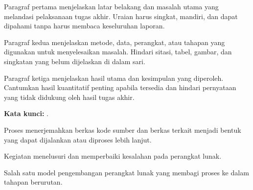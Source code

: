 Paragraf pertama menjelaskan latar belakang dan masalah utama yang melandasi pelaksanaan tugas akhir. Uraian harus singkat, mandiri, dan dapat dipahami tanpa harus membaca keseluruhan laporan.

Paragraf kedua menjelaskan metode, data, perangkat, atau tahapan yang digunakan untuk menyelesaikan masalah. Hindari sitasi, tabel, gambar, dan singkatan yang belum dijelaskan di dalam sari.

Paragraf ketiga menjelaskan hasil utama dan kesimpulan yang diperoleh. Cantumkan hasil kuantitatif penting apabila tersedia dan hindari pernyataan yang tidak didukung oleh hasil tugas akhir.

\vspace{6mm}
\noindent\textbf{Kata kunci:} \kataKunci.


\begin{description}[style=multiline,leftmargin=35mm,font=\normalfont]
  \item[Compile] Proses menerjemahkan berkas kode sumber dan berkas terkait menjadi bentuk yang dapat dijalankan atau diproses lebih lanjut.
  \item[Debug] Kegiatan menelusuri dan memperbaiki kesalahan pada perangkat lunak.
  \item[Waterfall] Salah satu model pengembangan perangkat lunak yang membagi proses ke dalam tahapan berurutan.
\end{description}

\clearpage
{}
{}
\begingroup
\singlespacing
\tableofcontents
\endgroup

\clearpage
{}
{}
\begingroup
\singlespacing
\listoftables
\endgroup

\clearpage
{}
{}
\begingroup
\singlespacing
\listoffigures
\endgroup
